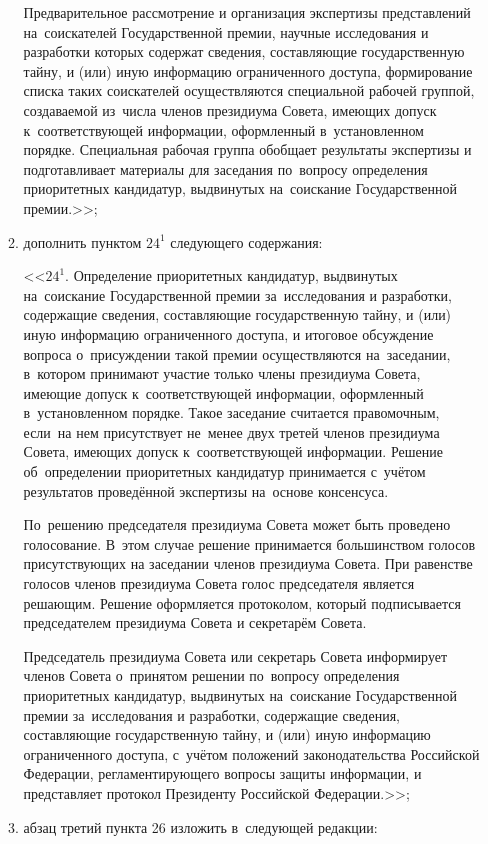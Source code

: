 \documentclass[14pt, a4paper]{extarticle}
\begin{document}
\begin{enumerate}
\begin{enumerate}[label=\asbuk*), ref=\asbuk*]
		Предварительное рассмотрение и организация экспертизы представлений на~соискателей Государственной премии, научные исследования и разработки которых содержат сведения, составляющие государственную тайну, и (или) иную информацию ограниченного доступа, формирование списка таких соискателей осуществляются специальной рабочей группой, создаваемой из~числа членов президиума Совета, имеющих допуск к~соответствующей информации, оформленный в~установленном порядке. Специальная рабочая группа обобщает результаты экспертизы и подготавливает материалы для заседания по~вопросу определения приоритетных кандидатур, выдвинутых на~соискание Государственной премии.>>;
		
		\item дополнить пунктом $24^1$ следующего содержания:
		
		<<$24^1$. Определение приоритетных кандидатур, выдвинутых на~соискание Государственной премии за~исследования и разработки, содержащие сведения, составляющие государственную тайну, и (или) иную информацию ограниченного доступа, и итоговое обсуждение вопроса о~присуждении такой премии осуществляются на~заседании, в~котором принимают участие только члены президиума Совета, имеющие допуск к~соответствующей информации, оформленный в~установленном порядке. Такое заседание считается правомочным, если~на нем присутствует не~менее двух третей членов президиума Совета, имеющих допуск к~соответствующей информации. Решение об~определении приоритетных кандидатур принимается с~учётом результатов проведённой экспертизы на~основе \mbox{консенсуса}.
		
		По~решению председателя президиума Совета может быть проведено голосование. В~этом случае решение принимается большинством голосов присутствующих на заседании членов президиума Совета. При равенстве голосов членов президиума Совета голос председателя является решающим. Решение оформляется протоколом, который подписывается председателем президиума Совета и секретарём Совета.
		
		Председатель президиума Совета или секретарь Совета информирует членов Совета о~принятом решении по~вопросу определения приоритетных кандидатур, выдвинутых на~соискание Государственной премии за~исследования и разработки, содержащие сведения, составляющие государственную тайну, и (или) иную информацию ограниченного доступа, с~учётом положений законодательства Российской Федерации, регламентирующего вопросы защиты информации, и представляет протокол Президенту Российской Федерации.>>;
		
		\item абзац третий пункта 26 изложить в~следующей редакции:
		

\end{enumerate}
\end{enumerate}
\end{document}

